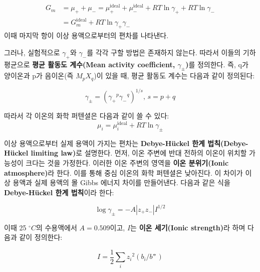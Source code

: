         \begin{equation*}
            \begin{aligned}
                G_m &= \mu_{+}+\mu_{-}=\mu_{+}^\mathrm{ideal}+\mu_{-}^\mathrm{ideal}+RT\ln{\gamma_{+}}+RT\ln{\gamma_{-}}\\
                &= G_m^\mathrm{ideal}+RT\ln{\gamma_{+} \gamma_{-}}
            \end{aligned}
        \end{equation*}
        이때 마지막 항이 이상 용액으로부터의 편차를 나타낸다.
        \par 그러나, 실험적으로 $\gamma_{+}$와 $\gamma_{-}$를 각각 구할 방법은 존재하지 않는다. 따라서 이들의 기하평균으로 
        \textbf{평균 활동도 계수(Mean activity coefficient, $\gamma_{\pm}$)}를 정의한다. 즉, q가 양이온과 p가 음이온(즉 $M_p X_q$)이 
        있을 때, 평균 활동도 계수는 다음과 같이 정의된다:
        \begin{defn}[평균 활동도 계수]
        \begin{equation*}
            \gamma_\pm = \left({\gamma_{+}}^p{\gamma_{-}}^q\right)^{1/s},\, s=p+q
        \end{equation*}
        \end{defn}
        따라서 각 이온의 화학 퍼텐셜은 다음과 같이 쓸 수 있다:
        \begin{equation*}
            \mu_i = \mu_i^\mathrm{ideal}+RT\ln{\gamma_\pm}
        \end{equation*}
        \par 이상 용액으로부터 실제 용액이 가지는 편차는 \textbf{Debye-Hückel 한계 법칙(Debye-Hückel limiting law)}로 설명한다. 
        먼저, 이온 주변에 반대 전하의 이온이 위치할 가능성이 크다는 것을 가정한다. 이러한 이온 주변의 영역을 \textbf{이온 분위기(Ionic atmosphere)}라 한다. 
        이를 통해 중심 이온의 화학 퍼텐셜은 낮아진다. 이 차이가 이상 용액과 실제 용액의 몰 Gibbs 에너지 차이를 만들어낸다. 다음과 같은 
        식을 \textbf{Debye-Hückel 한계 법칙}이라 한다:
        \begin{law}
        \begin{equation*}
            \log{\gamma_\pm}=-A\left\vert z_{+}z_{-}\right\vert I^{1/2}
        \end{equation*}
        \end{law}
        이때 25 $^\circ C$의 수용액에서 $A = 0.509$이고, $I$는 \textbf{이온 세기(Ionic strength)}라 하며 다음과 같이 정의한다:
        \begin{defn}[이온 세기]
        \begin{equation*}
            I = \frac{1}{2}\sum_{i}{z_i}^2\left(b_i/b^\circlehbar\right)
        \end{equation*}
        \end{defn}
